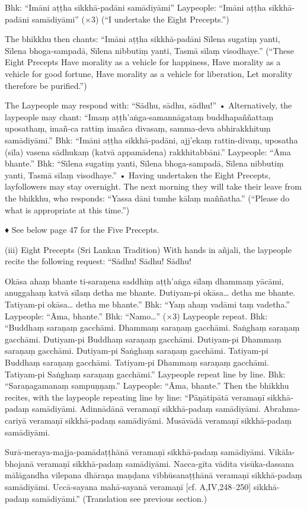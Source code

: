 Bhk: “Imāni aṭṭha sikkhā-padāni samādiyāmi”
Laypeople:
“Imāni aṭṭha sikkhā-padāni samādiyāmi” (×3)
(“I undertake the Eight Precepts.”)

The bhikkhu then chants:
“Imāni aṭṭha sikkhā-padāni
Sīlena sugatiṃ yanti,
Sīlena bhoga-sampadā,
Sīlena nibbutiṃ yanti,
Tasmā sīlaṃ visodhaye.”
(“These Eight Precepts
Have morality as a vehicle for happiness,
Have morality as a vehicle for good fortune,
Have morality as a vehicle for liberation,
Let morality therefore be purified.”)

The Laypeople may respond with:
“Sādhu, sādhu, sādhu!”
• Alternatively, the laypeople may chant:
“Imaṃ aṭṭh’aṅga-samannāgataṃ buddhapaññattaṃ uposathaṃ, imañ-ca rattiṃ imañca divasaṃ, samma-deva abhirakkhituṃ
samādiyāmi.”
Bhk:
“Imāni aṭṭha sikkhā-padāni,
ajj’ekaṃ rattin-divaṃ,
uposatha (sīla) vasena sādhukaṃ (katvā
appamādena) rakkhitabbāni.”
Laypeople:
“Āma bhante.”
Bhk:
“Sīlena sugatiṃ yanti,
Sīlena bhoga-sampadā,
Sīlena nibbutiṃ yanti,
Tasmā sīlaṃ visodhaye.”
• Having undertaken the Eight Precepts, layfollowers may stay overnight. The next morning they will take their leave from the bhikkhu,
who responds:
“Yassa dāni tumhe kālaṃ maññatha.”
(“Please do what is appropriate at this time.”)

♦ See below page 47 for the Five Precepts.

(iii) Eight Precepts (Sri Lankan Tradition)
With hands in añjali, the laypeople recite the
following request:
“Sādhu! Sādhu! Sādhu!

Okāsa ahaṃ bhante ti-saraṇena saddhiṃ
aṭṭh’aṅga sīlaṃ dhammaṃ yācāmi,
anuggahaṃ katvā sīlaṃ detha me bhante.
Dutiyam-pi okāsa… detha me bhante.
Tatiyam-pi okāsa… detha me bhante.”
Bhk:
“Yaṃ ahaṃ vadāmi taṃ vadetha.”
Laypeople: “Āma, bhante.”
Bhk:
“Namo…” (×3)
Laypeople repeat.
Bhk: “Buddhaṃ saraṇaṃ gacchāmi.
Dhammaṃ saraṇaṃ gacchāmi.
Saṅghaṃ saraṇaṃ gacchāmi.
Dutiyam-pi Buddhaṃ saraṇaṃ gacchāmi.
Dutiyam-pi Dhammaṃ saraṇaṃ gacchāmi.
Dutiyam-pi Saṅghaṃ saraṇaṃ gacchāmi.
Tatiyam-pi Buddhaṃ saraṇaṃ gacchāmi.
Tatiyam-pi Dhammaṃ saraṇaṃ gacchāmi.
Tatiyam-pi Saṅghaṃ saraṇaṃ gacchāmi.”
Laypeople repeat line by line.
Bhk:
“Saraṇagamanaṃ sampuṇṇaṃ.”
Laypeople: “Āma, bhante.”
Then the bhikkhu recites, with the laypeople
repeating line by line:
“Pāṇātipātā veramaṇī sikkhā-padaṃ samādiyāmi.
Adinnādānā veramaṇī sikkhā-padaṃ samādiyāmi.
Abrahma-cariyā veramaṇī sikkhā-padaṃ
samādiyāmi.
Musāvādā veramaṇī sikkhā-padaṃ samādiyāmi.

Surā-meraya-majja-pamādaṭṭhānā veramaṇī
sikkhā-padaṃ samādiyāmi.
Vikāla-bhojanā veramaṇī sikkhā-padaṃ
samādiyāmi.
Nacca-gīta vādita visūka-dassana mālāgandha vilepana dhāraṇa maṇḍana
vibhūsanaṭṭhānā veramaṇī sikkhā-padaṃ
samādiyāmi.
Uccā-sayana mahā-sayanā veramaṇī
[cf. A,IV,248–250]
sikkhā-padaṃ samādiyāmi.”
(Translation see previous section.)

